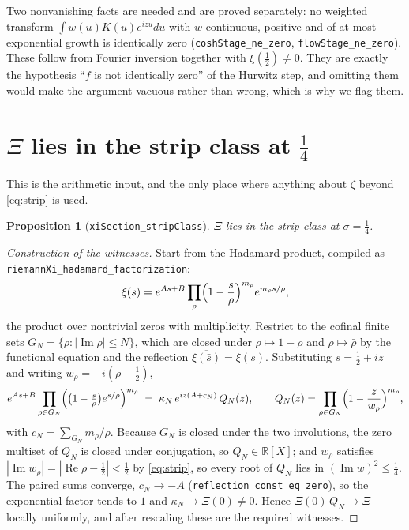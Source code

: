 \documentclass[11pt]{article}
\newtheorem{proposition}[theorem]{Proposition}
\theoremstyle{definition}
\DeclareMathOperator{\Imop}{Im}
\DeclareMathOperator{\Reop}{Re}
\begin{document}
Two nonvanishing facts are needed and are proved separately: no weighted transform
$\int w(u)K(u)e^{izu}du$ with $w$ continuous, positive and of at most exponential growth is
identically zero (\texttt{coshStage\_ne\_zero}, \texttt{flowStage\_ne\_zero}).  These follow from
Fourier inversion together with $\xi(\tfrac12)\ne0$.  They are exactly the hypothesis ``$f$ is not
identically zero'' of the Hurwitz step, and omitting them would make the argument vacuous rather than
wrong, which is why we flag them.

\section{\texorpdfstring{$\Xi$ lies in the strip class at $\tfrac14$}{Xi lies in the strip class at 1/4}}\label{sec:hadamard}

This is the arithmetic input, and the only place where anything about $\zeta$ beyond \eqref{eq:strip}
is used.

\begin{proposition}[\texttt{xiSection\_stripClass}]\label{prop:strip}
$\Xi$ lies in the strip class at $\sigma=\tfrac14$.
\end{proposition}

\begin{proof}[Construction of the witnesses]
Start from the Hadamard product, compiled as \texttt{riemannXi\_hadamard\_factorization}:
\[
  \xi(s)=e^{As+B}\prod_{\rho}\Bigl(1-\frac s\rho\Bigr)^{m_\rho}e^{m_\rho s/\rho},
\]
the product over nontrivial zeros with multiplicity.  Restrict to the cofinal finite sets
$G_N=\{\rho:|\Imop\rho|\le N\}$, which are closed under $\rho\mapsto1-\rho$ and $\rho\mapsto\bar\rho$
by the functional equation and the reflection $\overline{\xi(\bar s)}=\xi(s)$.  Substituting
$s=\tfrac12+iz$ and writing $w_\rho=-i(\rho-\tfrac12)$,
\[
  e^{As+B}\prod_{\rho\in G_N}\Bigl(\bigl(1-\tfrac s\rho\bigr)e^{s/\rho}\Bigr)^{m_\rho}
  \;=\;\kappa_N\,e^{iz(A+c_N)}\,Q_N(z),
  \qquad
  Q_N(z)=\prod_{\rho\in G_N}\Bigl(1-\frac z{w_\rho}\Bigr)^{m_\rho},
\]
with $c_N=\sum_{G_N}m_\rho/\rho$.  Because $G_N$ is closed under the two involutions, the zero
multiset of $Q_N$ is closed under conjugation, so $Q_N\in\mathbb R[X]$; and $w_\rho$ satisfies
$|\Imop w_\rho|=|\Reop\rho-\tfrac12|<\tfrac12$ by \eqref{eq:strip}, so every root of $Q_N$ lies in
$(\Imop w)^{2}\le\tfrac14$.  The paired sums converge, $c_N\to-A$
(\texttt{reflection\_const\_eq\_zero}), so the exponential factor tends to $1$ and
$\kappa_N\to\Xi(0)\ne0$.  Hence $\Xi(0)\,Q_N\to\Xi$ locally uniformly, and after rescaling these are
the required witnesses.
\end{proof}
\end{document}
